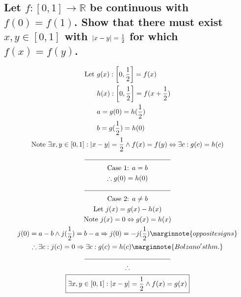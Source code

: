 \documentclass[letterpaper]{article}
\DeclarePairedDelimiter\abs{\lvert}{\rvert}
\DeclarePairedDelimiter\range{[}{]}
\begin{document}
\subsection{Let $f:[0,1]\rightarrow\mathbb{R}$ be continuous with $f(0)=f(1)$. Show that there must exist $x,y\in[0,1]$ with $\abs{x-y}=\frac{1}{2}$ for which $f(x)=f(y)$.}
\begin{gather*}
	\begin{aligned}
		\text{Let }&g(x):\range[\bigg]{0,\frac{1}{2}}=f(x) \\
		&h(x):\range[\bigg]{0,\frac{1}{2}}=f(x+\frac{1}{2}) \\
		&a=g(0)=h(\frac{1}{2}) \\
		&b=g(\frac{1}{2})=h(0)
	\end{aligned} \\
	\text{Note } \exists x,y\in\range{0, 1}:\abs{x-y}=\frac{1}{2}\land f(x)=f(y) \Leftrightarrow \exists c:g(c)=h(c) \\
	\line(1, 0){125} \\
	\text{Case 1: }a=b \\
	\therefore g(0)=h(0) \\
	\line(1, 0){125} \\
	\text{Case 2: }a\neq b  \\
	\text{Let }j(x)=g(x)-h(x) \\
	\text{Note }j(x)=0\Leftrightarrow g(x)=h(x) \\
	j(0)=a-b\land j(\frac{1}{2})=b-a\Rightarrow j(0)=-j(\frac{1}{2}) \marginnote{opposite signs} \\
	\therefore \exists c:j(c)=0\Rightarrow\exists c:g(c)=h(c) \marginnote{Bolzano's thm.} \\
	\line(1, 0){125} \\
	\therefore \\
	\boxed{\exists x,y\in\range{0, 1}:\abs{x-y}=\frac{1}{2}\land f(x)=g(x)}
\end{gather*}
\end{document}
